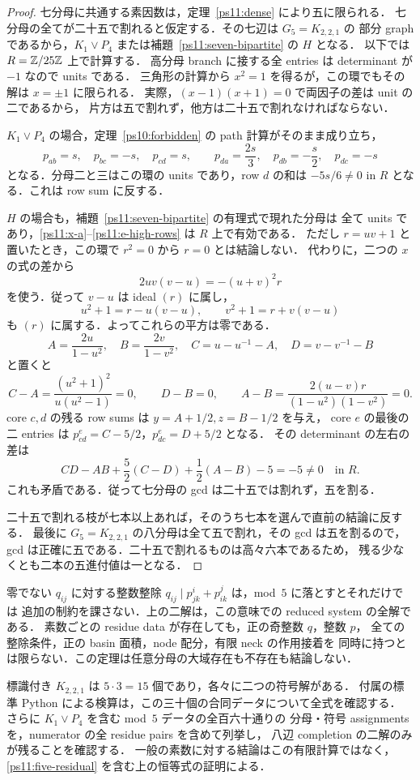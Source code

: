 \begin{proof}
七分母に共通する素因数は，定理~\ref{ps11:dense} により五に限られる．
七分母の全てが二十五で割れると仮定する．その七辺は $G_5=K_{2,2,1}$ の
部分 graph であるから，$K_1\vee P_4$ または補題~\ref{ps11:seven-bipartite} の $H$ となる．
以下では $R=\mathbb Z/25\mathbb Z$ 上で計算する．
高分母 branch に接する全 entries は determinant が $-1$ なので units である．
三角形の計算から $x^2=1$ を得るが，この環でもその解は $x=\pm1$ に限られる．
実際，$(x-1)(x+1)=0$ で両因子の差は unit の二であるから，
片方は五で割れず，他方は二十五で割れなければならない．

$K_1\vee P_4$ の場合，定理~\ref{ps10:forbidden} の path 計算がそのまま成り立ち，
\[
 p_{ab}=s,\quad p_{bc}=-s,\quad p_{cd}=s,
 \qquad p_{da}=\frac{2s}{3},\quad
 p_{db}=-\frac{s}{2},\quad p_{dc}=-s
\]
となる．分母二と三はこの環の units であり，row $d$ の和は
$-5s/6\ne0$ in $R$ となる．これは row sum に反する．

$H$ の場合も，補題~\ref{ps11:seven-bipartite} の有理式で現れた分母は
全て units であり，\eqref{ps11:x-a}--\eqref{ps11:e-high-rows} は $R$ 上で有効である．
ただし $r=uv+1$ と置いたとき，この環で $r^2=0$ から $r=0$ とは結論しない．
代わりに，二つの $x$ の式の差から
\[
 2uv(v-u)=-(u+v)^2r
\]
を使う．従って $v-u$ は ideal $(r)$ に属し，
\[
 u^2+1=r-u(v-u),\qquad v^2+1=r+v(v-u)
\]
も $(r)$ に属する．よってこれらの平方は零である．
\[
 A=\frac{2u}{1-u^2},\quad B=\frac{2v}{1-v^2},\quad
 C=u-u^{-1}-A,\quad D=v-v^{-1}-B
\]
と置くと
\[
 C-A=\frac{(u^2+1)^2}{u(u^2-1)}=0,\qquad D-B=0,
 \qquad
 A-B=\frac{2(u-v)r}{(1-u^2)(1-v^2)}=0.
\]
core $c,d$ の残る row sums は $y=A+1/2,z=B-1/2$ を与え，
core $e$ の最後の二 entries は $p^e_{cd}=C-5/2$，$p^e_{dc}=D+5/2$ となる．
その determinant の左右の差は
\[
 CD-AB+\frac52(C-D)+\frac12(A-B)-5=-5\ne0
 \quad\text{in }R.
\]
これも矛盾である．従って七分母の gcd は二十五では割れず，五を割る．

二十五で割れる枝が七本以上あれば，そのうち七本を選んで直前の結論に反する．
最後に $G_5=K_{2,2,1}$ の八分母は全て五で割れ，その gcd は五を割るので，
gcd は正確に五である．二十五で割れるものは高々六本であるため，
残る少なくとも二本の五進付値は一となる．
\end{proof}

\begin{remark}[合同分類と整数接着の区別]\label{ps11:modular-scope}
零でない $q_{ij}$ に対する整数整除
$q_{ij}\mid p^i_{jk}+p^j_{ik}$ は，mod~$5$ に落とすとそれだけでは
追加の制約を課さない．上の二解は，この意味での reduced system の全解である．
素数ごとの residue data が存在しても，正の奇整数 $q$，整数 $p$，
全ての整除条件，正の basin 面積，node 配分，有限 neck の作用接着を
同時に持つとは限らない．この定理は任意分母の大域存在も不存在も結論しない．

標識付き $K_{2,2,1}$ は $5\cdot3=15$ 個であり，各々に二つの符号解がある．
付属の標準 Python による検算は，この三十個の合同データについて全式を確認する．
さらに $K_1\vee P_4$ を含む mod~$5$ データの全百六十通りの
分母・符号 assignments を，numerator の全 residue pairs を含めて列挙し，
八辺 completion の二解のみが残ることを確認する．
一般の素数に対する結論はこの有限計算ではなく，
\eqref{ps11:five-residual} を含む上の恒等式の証明による．
\end{remark}
